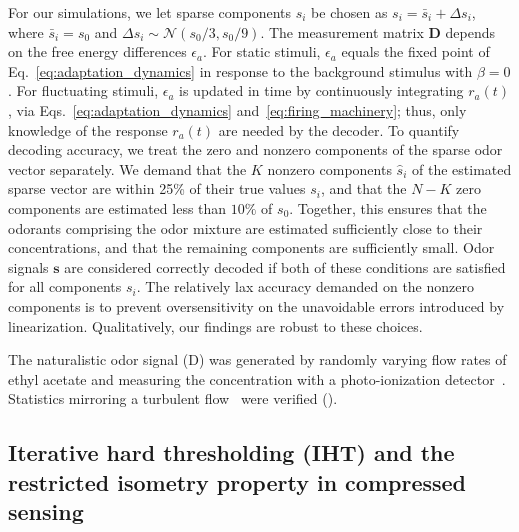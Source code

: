 \documentclass[9pt,lineno]{elife}
\begin{document}
For our simulations, we let sparse components $s_i$ be chosen as $s_i = \bar s_i + \Delta s_i$, where $\bar s_i= s_0$ and $\Delta s_i \sim \mathcal {N} (s_0/3, s_0/9)$. The measurement matrix $\mathbf D$ depends on the free energy differences $\epsilon_a$. For static stimuli, $\epsilon_a$ equals the fixed point of Eq.~\ref{eq:adaptation_dynamics} in response to the background stimulus with $\beta = 0$. For fluctuating stimuli, $\epsilon_a$ is updated in time by continuously integrating  $r_a(t)$, via Eqs.~\ref{eq:adaptation_dynamics} and~\ref{eq:firing_machinery}; thus, only knowledge of the response $r_a(t)$ are needed by the decoder. To quantify decoding accuracy, we treat the zero and nonzero components of the sparse odor vector separately. We demand that the $K$ nonzero components $\hat s_i$ of the estimated sparse vector are within 25\% of their true values $s_i$, and that the $N - K$ zero components are estimated less than $10\%$ of $s_0$. Together, this ensures that the odorants comprising the odor mixture are estimated sufficiently close to their concentrations, and that the remaining components are sufficiently small. Odor signals $\mathbf s$ are considered correctly decoded if both of these conditions are satisfied for all components $s_i$. The relatively lax accuracy demanded on the nonzero components is to prevent oversensitivity on the unavoidable errors introduced by linearization. Qualitatively, our findings are robust to these choices. 

The naturalistic odor signal (D) was generated by randomly varying flow rates of ethyl acetate and measuring the concentration with a photo-ionization detector~\citep{srinivas_elife}. Statistics mirroring a turbulent flow~\citep{celani} were verified (). \\


\subsection{Iterative hard thresholding (IHT) and the restricted isometry property in compressed sensing} 
\end{document}

